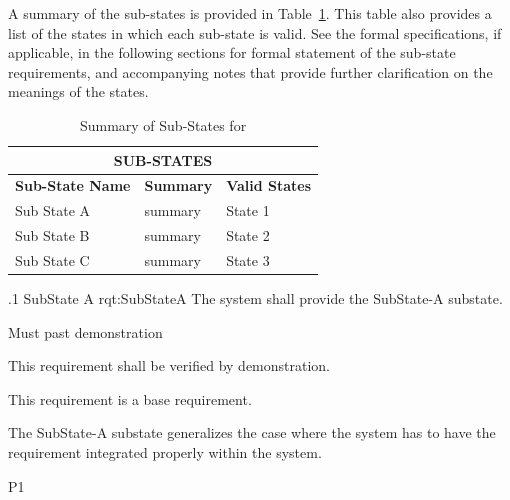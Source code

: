 A summary of the sub-states is provided in Table~\ref{tab:SubStates}.
This table also provides a list of the states in which each sub-state is valid.
See the formal specifications, if applicable, in the following sections for formal statement of the sub-state requirements, and accompanying notes that provide further clarification on the meanings of the states.
\begin{table}[h]
	\begin{center}
		\begin{tabular}{|p{1.0in}|p{4.0in}|p{1.0in}|}
			\hline
			\hline
			\multicolumn{3}{|c|}{{\bf SUB-STATES}} \\
			\hline
				{\bf Sub-State Name} & {\bf Summary} & {\bf Valid States} \\ 
			\hline
			\hline
Sub State A & summary & State 1 \\ \hline
Sub State B & summary & State 2 \\ \hline
Sub State C & summary & State 3 \\ 
			\hline
			\hline
		\end{tabular}
		\caption{Summary of Sub-States for \ThisSystem}
		\label{tab:SubStates}
	\end{center}
\end{table}


\ONERQMTV
{\RqtNumberBase.1}
{SubState A}
{rqt:SubStateA}
{The system shall provide the SubState-A substate.}
{
	\item [Phase 1] Must past demonstration
}
{This requirement shall be verified by demonstration.}
{
	\item [N/A] This requirement is a base requirement.
}
{
	\item The SubState-A substate generalizes the case where the system has to have the requirement integrated properly within the system.
}
{P1}


